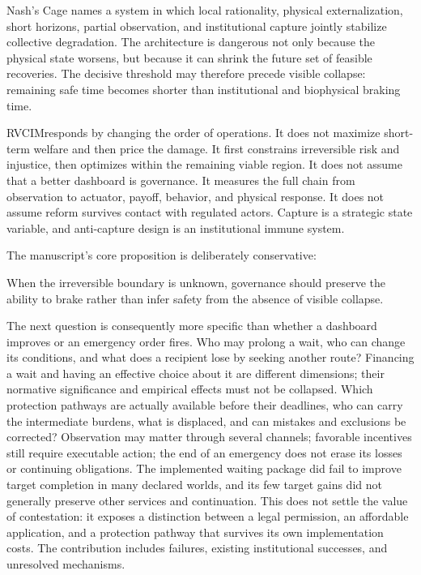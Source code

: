 \documentclass[11pt,a4paper]{article}
\numberwithin{equation}{section}
\theoremstyle{definition}
\theoremstyle{plain}
\theoremstyle{remark}
\newcommand{\RVCIM}{\textsc{RVCIM}}
\begin{document}
Nash's Cage names a system in which local rationality, physical externalization, short horizons, partial observation, and institutional capture jointly stabilize collective degradation. The architecture is dangerous not only because the physical state worsens, but because it can shrink the future set of feasible recoveries. The decisive threshold may therefore precede visible collapse: remaining safe time becomes shorter than institutional and biophysical braking time.

\RVCIM responds by changing the order of operations. It does not maximize short-term welfare and then price the damage. It first constrains irreversible risk and injustice, then optimizes within the remaining viable region. It does not assume that a better dashboard is governance. It measures the full chain from observation to actuator, payoff, behavior, and physical response. It does not assume reform survives contact with regulated actors. Capture is a strategic state variable, and anti-capture design is an institutional immune system.

The manuscript's core proposition is deliberately conservative:
\begin{corebox}
When the irreversible boundary is unknown, governance should preserve the ability to brake rather than infer safety from the absence of visible collapse.
\end{corebox}

The next question is consequently more specific than whether a dashboard improves or an emergency order fires. Who may prolong a wait, who can change its conditions, and what does a recipient lose by seeking another route? Financing a wait and having an effective choice about it are different dimensions; their normative significance and empirical effects must not be collapsed. Which protection pathways are actually available before their deadlines, who can carry the intermediate burdens, what is displaced, and can mistakes and exclusions be corrected? Observation may matter through several channels; favorable incentives still require executable action; the end of an emergency does not erase its losses or continuing obligations. The implemented waiting package did fail to improve target completion in many declared worlds, and its few target gains did not generally preserve other services and continuation. This does not settle the value of contestation: it exposes a distinction between a legal permission, an affordable application, and a protection pathway that survives its own implementation costs. The contribution includes failures, existing institutional successes, and unresolved mechanisms.
\end{document}
